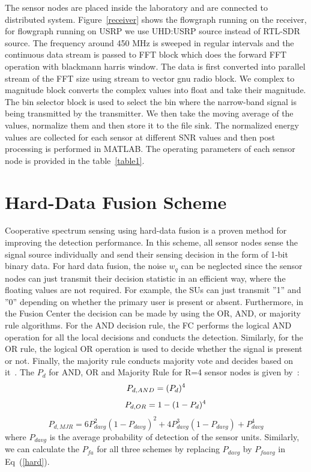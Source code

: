 The sensor nodes are placed inside the laboratory and are connected to distributed system. Figure~\ref{receiver} shows the flowgraph running on the receiver, for flowgraph running on USRP we use UHD:USRP source instead of RTL-SDR source. The frequency around 450 MHz is sweeped in regular intervals and the continuous data stream is passed to FFT block which does the forward FFT operation with blackmann harris window. The data is first converted into parallel stream of the FFT size using stream to vector gnu radio block. We complex to magnitude block converts the complex values into float and take their magnitude. The bin selector block is used to select the bin where the narrow-band signal is being transmitted by the transmitter. We then take the moving average of the values, normalize them and then store it to the file sink. The normalized energy values are collected for each sensor at different SNR values and then post processing is performed in MATLAB. The operating parameters of each sensor node is provided in the table~\ref{table1}.

\section{Hard-Data Fusion Scheme}
\label{hardfusion}
Cooperative spectrum sensing using hard-data fusion is a proven method for improving the detection performance. In this scheme, all sensor nodes sense the signal source individually and send their sensing decision in the form of 1-bit binary data. For hard data fusion, the noise $w_q$ can be neglected since the sensor nodes can just transmit their decision statistic in an efficient way, where the floating values are not required. For example, the SUs can just transmit ''1'' and ''0'' depending on whether the primary user is present or absent. Furthermore, in the Fusion Center the decision can be made by using the OR, AND, or majority rule algorithms. For the AND decision rule, the FC performs the logical AND operation for all the local decisions and conducts the detection. Similarly, for the OR rule, the logical OR operation is used to decide whether the signal is present or not. Finally, the majority rule conducts majority vote and decides based on it~\cite{ghasemi2005collaborative,duan2010performance}. The $P_d$ for AND, OR and Majority Rule for R=4 sensor nodes is given by~\cite{inphtn15}:
\begin{equation}
P_{d,AND} = (P_d)^4\nonumber\\
\vspace{-15pt}
\end{equation}
\begin{equation}
\label{hard}
~~~~~~~P_{d,OR} = 1-(1-P_d)^4
\vspace{-15pt}
\end{equation}
\begin{equation}
P_{d,MJR} = 6P_{davg}^2(1-P_{davg})^2+4P_{davg}^3(1-P_{davg})+P_{davg}^4\nonumber
\end{equation}
where $P_{davg}$ is the average probability of detection of the sensor units. Similarly, we can calculate the $P_{fa}$ for all three schemes by replacing $P_{davg}$ by $P_{faavg}$ in Eq~(\ref{hard}).

